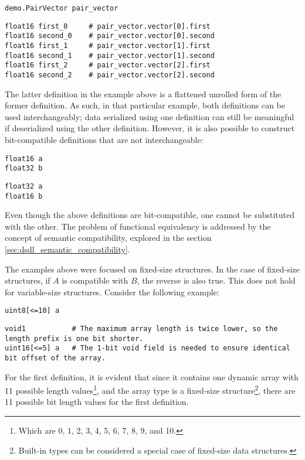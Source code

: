 \begin{verbatim}
demo.PairVector pair_vector
\end{verbatim}

\begin{verbatim}
float16 first_0     # pair_vector.vector[0].first
float16 second_0    # pair_vector.vector[0].second
float16 first_1     # pair_vector.vector[1].first
float16 second_1    # pair_vector.vector[1].second
float16 first_2     # pair_vector.vector[2].first
float16 second_2    # pair_vector.vector[2].second
\end{verbatim}

The latter definition in the example above is a flattened unrolled form of the former definition.
As such, in that particular example, both definitions can be used interchangeably;
data serialized using one definition can still be meaningful if deserialized using the other definition.
However, it is also possible to construct bit-compatible definitions that are not interchangeable:

\begin{verbatim}
float16 a
float32 b
\end{verbatim}

\begin{verbatim}
float32 a
float16 b
\end{verbatim}

Even though the above definitions are bit-compatible, one cannot be substituted with the other.
The problem of functional equivalency is addressed by the concept of semantic compatibility,
explored in the section \ref{sec:dsdl_semantic_compatibility}.

The examples above were focused on fixed-size structures.
In the case of fixed-size structures, if $A$ is compatible with $B$, the reverse is also true.
This does not hold for variable-size structures.
Consider the following example:

\begin{verbatim}
uint8[<=10] a
\end{verbatim}

\begin{verbatim}
void1           # The maximum array length is twice lower, so the length prefix is one bit shorter.
uint16[<=5] a   # The 1-bit void field is needed to ensure identical bit offset of the array.
\end{verbatim}

For the first definition, it is evident that since it contains one dynamic array with
11 possible length values\footnote{Which are 0, 1, 2, 3, 4, 5, 6, 7, 8, 9, and 10.},
and the array type is a fixed-size
structure\footnote{Built-in types can be considered a special case of fixed-size data structures.},
there are 11 possible bit length values for the first definition.


